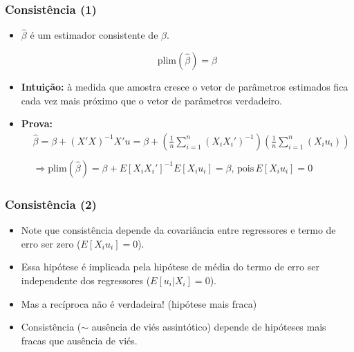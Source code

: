 \documentclass[10pt,slides,xcolor=pdftex,dvipsnames,table]{beamer}
\begin{document}

\begin{frame}[fragile]
	\frametitle{Consistência (1)}

\begin{itemize}\itemsep1.2em 

\item $\widehat{\beta}$ é um estimador consistente de $\beta$.

$$ \text{plim} (\widehat{\beta}) = \beta $$  
 
\item \textbf{Intuição:} à medida que amostra cresce o vetor de parâmetros estimados fica cada vez mais próximo que o vetor de parâmetros verdadeiro.

\item \textbf{Prova:}
\begin{align*}
& \widehat{\beta} = \beta + (X'X)^{-1} X'u = \beta + \left( \frac{1}{n} \sum_{i=1}^n (X_i X_i')^{-1} \right) \left( \frac{1}{n} \sum_{i=1}^n (X_i u_i) \right) \\
\\
& \Longrightarrow \text{plim} (\widehat{\beta}) = \beta + E[X_i X_i']^{-1} E [X_i u_i] = \beta, \, \text{pois} \, E [X_i u_i] = 0
\end{align*}


\end{itemize}

\end{frame}


\begin{frame}[fragile]
	\frametitle{Consistência (2)}

\begin{itemize}\itemsep1.2em 

\item Note que consistência depende da covariância entre regressores e termo de erro ser zero ($E [X_i u_i] = 0$). 

\item Essa hipótese é implicada pela hipótese de média do termo de erro ser independente dos regressores ($E [u_i | X_i] = 0$).

\item Mas a recíproca não é verdadeira! (hipótese mais fraca)

\item Consistência ($\sim$ ausência de viés assintótico) depende de hipóteses mais fracas que ausência de viés.    

\end{itemize}

\end{frame}
\end{document}
